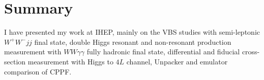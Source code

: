 \chapter{Summary}
I have presented my work at IHEP, mainly on the VBS studies with semi-leptonic $W^+W^-jj$ final state, double Higgs resonant and non-resonant production measurement with $WW\gamma\gamma$ fully hadronic final state, differential and fiducial cross-section measurement with Higgs to $4L$ channel, Unpacker and emulator comparison of CPPF.